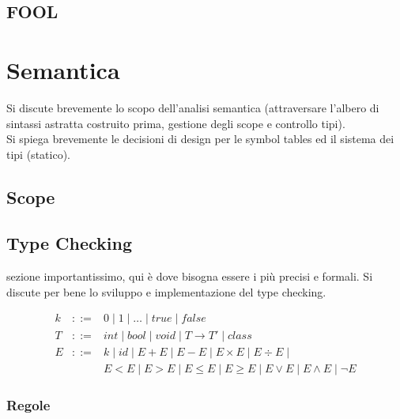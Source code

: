 \documentclass{scrreprt}
\begin{document}
\section{FOOL}

\chapter{Semantica}
Si discute brevemente lo scopo dell'analisi semantica (attraversare l'albero di sintassi astratta costruito prima, gestione
degli scope e controllo tipi).\\
Si spiega brevemente le decisioni di design per le symbol tables ed il sistema dei tipi (statico).
\section{Scope}

\section{Type Checking}
sezione importantissimo, qui è dove bisogna essere i più precisi e formali. Si discute per bene lo sviluppo
e implementazione del type checking.

\[
\begin{array}{lcl}
k & ::= & 0 \mid 1 \mid \dots \mid true \mid false\\
T & ::= & int \mid bool \mid void \mid T \to T' \mid class\\
E & ::= & k \mid id \mid E + E \mid E - E \mid E \times E \mid E \div E \mid\\
& &  E < E \mid E > E \mid E \le E \mid E \ge E \mid E \lor E \mid E \land E \mid \lnot E
\end{array}
\]

\subsection{Regole}
\end{document}
